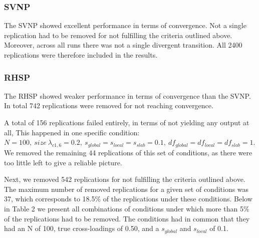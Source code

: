 \documentclass[
  man, donotrepeattitle,floatsintext]{apa6}
\begin{document}
\hypertarget{svnp}{%
\subsubsection{SVNP}\label{svnp}}

The SVNP showed excellent performance in terms of convergence. Not a single replication had to be removed for not fulfilling the criteria outlined above. Moreover, across all runs there was not a single divergent transition. All 2400 replications were therefore included in the results.

\hypertarget{rhsp}{%
\subsubsection{RHSP}\label{rhsp}}

The RHSP showed weaker performance in terms of convergence than the SVNP. In total 742 replications were removed for not reaching convergence.

A total of 156 replications failed entirely, in terms of not yielding any output at all, This happened in one specific condition: \(N = 100, \ size \ \lambda_{c1,6} = 0.2, \ s_{global} = s_{local} = s_{slab} = 0.1, \ df_{global} = df_{local} = df_{slab} = 1\). We removed the remaining 44 replications of this set of conditions, as there were too little left to give a reliable picture.

Next, we removed 542 replications for not fulfilling the criteria outlined above. The maximum number of removed replications for a given set of conditions was 37, which corresponds to 18.5\% of the replications under these conditions. Below in Table 2 we present all combinations of conditions under which more than 5\% of the replications had to be removed. The conditions had in common that they had an N of 100, true cross-loadings of 0.50, and a \(s_{global}\) and \(s_{local}\) of 0.1.
\end{document}
